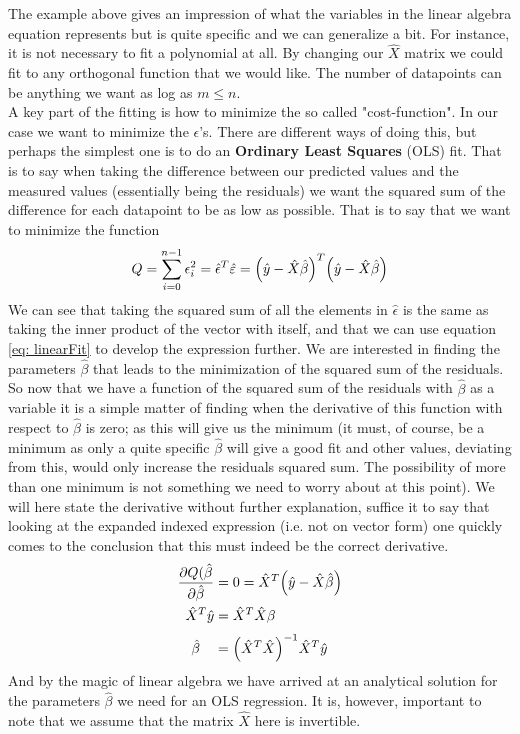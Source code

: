 The example above gives an impression of what the variables in the linear algebra equation represents but is quite specific and we can generalize a bit. For instance, it is not necessary to fit a polynomial at all. By changing our $\hat{X}$ matrix we could fit to any orthogonal function that we would like. The number of datapoints can be anything we want as log as $m\leq n$.\\

A key part of the fitting is how to minimize the so called "cost-function". In our case we want to minimize the $\epsilon$'s. There are different ways of doing this, but perhaps the simplest one is to do an \textbf{Ordinary Least Squares} (OLS) fit. That is to say when taking the difference between our predicted values and the measured values (essentially being the residuals) we want the squared sum of the difference for each datapoint to be as low as possible. That is to say that we want to minimize the function
\begin{align*}
	Q = \sum_{i=0}^{n-1}\epsilon_i^2 = \hat{\epsilon}^T\hat{\varepsilon} = \qty(\hat{y}-\hat{X}\hat{\beta})^T\qty(\hat{y}-\hat{X}\hat{\beta})
\end{align*}
We can see that taking the squared sum of all the elements in $\hat{\epsilon}$ is the same as taking the inner product of the vector with itself, and that we can use equation \ref{eq: linearFit} to develop the expression further. We are interested in finding the parameters $\hat{\beta}$ that leads to the minimization of the squared sum of the residuals. So now that we have a function of the squared sum of the residuals with $\hat{\beta}$ as a variable it is a simple matter of finding when the derivative of this function with respect to $\hat{\beta}$ is zero; as this will give us the minimum (it must, of course, be a minimum as only a quite specific $\hat{\beta}$ will give a good fit and other values, deviating from this, would only increase the residuals squared sum. The possibility of more than one minimum is not something we need to worry about at this point). We will here state the derivative without further explanation, suffice it to say that looking at the expanded indexed expression (i.e. not on vector form) one quickly comes to the conclusion that this must indeed be the correct derivative.
\begin{align*}
	\pdv{Q(\hat{\beta}}{\hat{\beta}} &= 0 = \hat{X}^T\qty(\hat{y}-\hat{X}\hat{\beta})\\
	\hat{X}^T\hat{y} &= \hat{X}^T\hat{X}\beta
\end{align*}
\begin{align}\label{eq: beta}
	\hat{\beta} \quad= \qty(\hat{X}^T\hat{X})^{-1}\hat{X}^T\hat{y}
\end{align}
And by the magic of linear algebra we have arrived at an analytical solution for the parameters $\hat{\beta}$ we need for an OLS regression. It is, however, important to note that we assume that the matrix $\hat{X}$ here is invertible.

